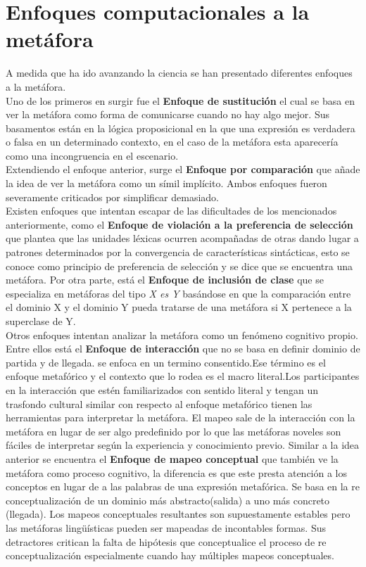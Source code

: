 \section{Enfoques computacionales a la metáfora}
A medida que ha ido avanzando la ciencia se han presentado diferentes enfoques a la metáfora. \\
Uno de los primeros en surgir fue el \textbf{Enfoque de sustitución} el cual se basa en ver la metáfora como forma de comunicarse cuando no hay algo mejor. Sus basamentos están en la lógica proposicional en la que una expresión es verdadera o falsa en un determinado contexto, en el caso de la metáfora esta aparecería como una incongruencia en el escenario. \\
Extendiendo el enfoque anterior, surge el \textbf{Enfoque por comparación} que añade la idea de ver la metáfora como un símil implícito. Ambos enfoques fueron severamente criticados por simplificar demasiado.\\
Existen enfoques que intentan escapar de las dificultades de los mencionados anteriormente, como el \textbf{Enfoque de violación a la preferencia de selección} que plantea que las unidades léxicas ocurren acompañadas de otras dando lugar a patrones determinados por la convergencia de características sintácticas, esto se conoce como principio de preferencia de selección y se dice que se encuentra una metáfora. Por otra parte, está el \textbf{Enfoque de inclusión de clase} que se especializa en metáforas del tipo \textit{X es Y} basándose en que la comparación entre el dominio X
y el dominio Y pueda tratarse de una metáfora si X pertenece a la superclase de Y.\\
Otros enfoques intentan analizar la metáfora como un fenómeno cognitivo propio. Entre ellos está el \textbf{Enfoque de interacción} que no se basa en definir dominio de partida y de llegada. se enfoca en un termino consentido.Ese término es el enfoque metafórico y el contexto que lo rodea es el macro literal.Los participantes en la interacción que estén familiarizados con sentido literal y tengan un trasfondo cultural similar con respecto al enfoque metafórico tienen las herramientas para interpretar la metáfora. El mapeo sale de la interacción con la metáfora en lugar de ser algo predefinido por lo que las metáforas noveles son fáciles de interpretar según la experiencia y conocimiento previo.
Similar a la idea anterior se encuentra el \textbf{Enfoque de mapeo conceptual} que también ve la metáfora como proceso cognitivo, la diferencia es que este presta atención a los conceptos en lugar de a las palabras de una expresión metafórica. Se basa en la re conceptualización de un dominio más abstracto(salida) a uno más concreto (llegada). Los mapeos conceptuales resultantes son supuestamente estables pero las metáforas lingüísticas pueden ser mapeadas de incontables formas. Sus detractores critican la falta de hipótesis que conceptualice el proceso de re conceptualización especialmente cuando hay múltiples mapeos conceptuales.\\
